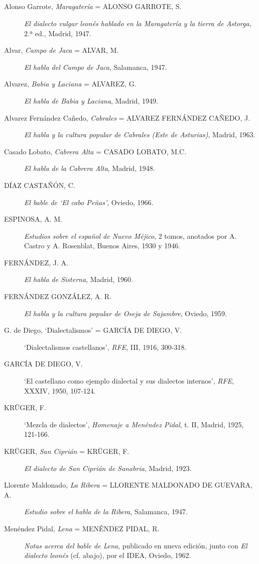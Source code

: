 \subsection{} \begin{description}
\item[Alonso Garrote, \textit{Maragatería} = ALONSO GARROTE, S.] \textit{El dialecto vulgar leonés hablado en la Maragatería y la tierra de Astorga}, 2.ª ed., Madrid, 1947.
\item[Alvar, \textit{Campo de Jaca} = ALVAR, M.] \textit{El habla del Campo de Jaca}, Salamanca, 1947.   
\item[Alvarez, \textit{Babia y Laciana} = ALVAREZ, G.] \textit{El habla de Babia y Laciana}, Madrid, 1949. 
\item[Alvarez Fernández Cañedo, \textit{Cabrales} = ALVAREZ FERNÁNDEZ CAÑEDO, J.] \textit{El habla y la cultura popular de Cabrales (Este de Asturias)}, Madrid, 1963.
\item[Casado Lobato, \textit{Cabrera Alta} = CASADO LOBATO, M.C.] \textit{El habla de la Cabrera Alta}, Madrid, 1948. 
\item[DÍAZ CASTAÑÓN, C.] \textit{El bable de `El cabo Peñas'}, Oviedo, 1966.
\item[ESPINOSA, A. M.] \textit{Estudios sobre el español de Nuevo Méjico}, 2 tomos, anotados por A. Castro y A. Rosenblat, Buenos Aires, 1930 y 1946. 
\item[FERNÁNDEZ, J. A.] \textit{El habla de Sisterna}, Madrid, 1960. 
\item[FERNÁNDEZ GONZÁLEZ, A. R.] \textit{El habla y la cultura popular de Oseja de Sajambre}, Oviedo, 1959.  
\item[G. de Diego, `Dialectalismos' = GARCÍA DE DIEGO, V.] `Dialectalismos castellanos', \textit{RFE}, III, 1916, 300-318. 
\item[GARCÍA DE DIEGO, V.] `El castellano como ejemplo dialectal y sus dialectos internos', \textit{RFE}, XXXIV, 1950, 107-124. 
\item[KRÜGER, F.] `Mezcla de dialectos', \textit{Homenaje a Menéndez Pidal}, t. II, Madrid, 1925, 121-166. 
\item[KRÜGER, \textit{San Ciprián} = KRÜGER, F.] \textit{El dialecto de San Ciprián de Sanabria}, Madrid, 1923. 
\item[Llorente Maldonado, \textit{La Ribera} = LLORENTE MALDONADO DE GUEVARA, A.] \textit{Estudio sobre el habla de la Ribera}, Salamanca, 1947.
\item[Menéndez Pidal, \textit{Lena} = MENÉNDEZ PIDAL, R.] \textit{Notas acerca del bable de Lena}, publicado en nueva edición, junto con \textit{El dialecto leonés} (cf. abajo), por el IDEA, Oviedo, 1962.  

\end{description}
